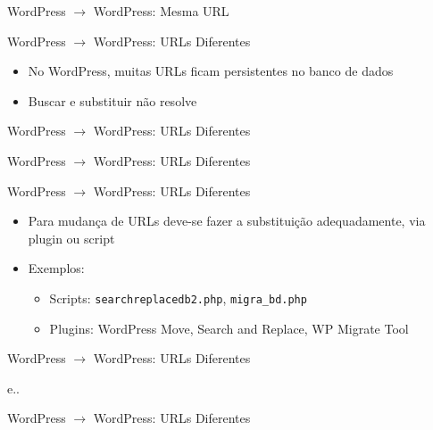 \documentclass[handout]{beamer}
\begin{document}
\begin{frame}[fragile]{WordPress $\rightarrow$ WordPress: Mesma URL}
  
\end{frame}

\begin{frame}{WordPress $\rightarrow$ WordPress: URLs Diferentes}
\begin{itemize}
  \pause \item No WordPress, muitas URLs ficam persistentes no banco de dados
  \pause \item Buscar e substituir não resolve
\end{itemize}
\end{frame}

\begin{frame}[fragile]{WordPress $\rightarrow$ WordPress: URLs Diferentes}
  
  \pause
  
\end{frame}

\begin{frame}[fragile]{WordPress $\rightarrow$ WordPress: URLs Diferentes}
  
  \pause
  
  \pause
  
\end{frame}

\begin{frame}{WordPress $\rightarrow$ WordPress: URLs Diferentes}
\begin{itemize}
  \item Para mudança de URLs deve-se fazer a substituição
        adequadamente, via plugin ou script
  \pause \item Exemplos:
  \begin{itemize}
    \item Scripts: \texttt{searchreplacedb2.php}, \texttt{migra\_bd.php}
    \item Plugins: WordPress Move, Search and Replace, WP Migrate Tool
  \end{itemize}
\end{itemize}
\end{frame}

\begin{frame}[fragile]{WordPress $\rightarrow$ WordPress: URLs Diferentes}
  
  e..
\end{frame}

\begin{frame}[fragile]{WordPress $\rightarrow$ WordPress: URLs Diferentes}
  
  \pause
  
  \pause
  
  \pause
  
\end{frame}
\end{document}

